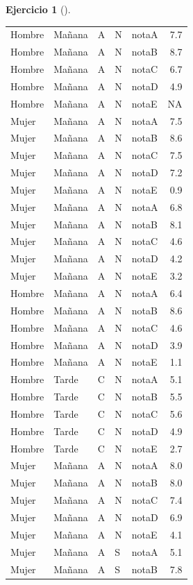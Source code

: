\documentclass[
  a4paper,
]{scrreport}
\theoremstyle{definition}
\newtheorem{exercise}{Ejercicio}[chapter]
\theoremstyle{remark}
\begin{document}
\begin{exercise}[]
\begin{enumerate}
\begin{tcolorbox}
\begin{longtable}[]{@{}lllllr@{}}
  Hombre & Mañana & A & N & notaA & 7.7 \\
  Hombre & Mañana & A & N & notaB & 8.7 \\
  Hombre & Mañana & A & N & notaC & 6.7 \\
  Hombre & Mañana & A & N & notaD & 4.9 \\
  Hombre & Mañana & A & N & notaE & NA \\
  Mujer & Mañana & A & N & notaA & 7.5 \\
  Mujer & Mañana & A & N & notaB & 8.6 \\
  Mujer & Mañana & A & N & notaC & 7.5 \\
  Mujer & Mañana & A & N & notaD & 7.2 \\
  Mujer & Mañana & A & N & notaE & 0.9 \\
  Mujer & Mañana & A & N & notaA & 6.8 \\
  Mujer & Mañana & A & N & notaB & 8.1 \\
  Mujer & Mañana & A & N & notaC & 4.6 \\
  Mujer & Mañana & A & N & notaD & 4.2 \\
  Mujer & Mañana & A & N & notaE & 3.2 \\
  Hombre & Mañana & A & N & notaA & 6.4 \\
  Hombre & Mañana & A & N & notaB & 8.6 \\
  Hombre & Mañana & A & N & notaC & 4.6 \\
  Hombre & Mañana & A & N & notaD & 3.9 \\
  Hombre & Mañana & A & N & notaE & 1.1 \\
  Hombre & Tarde & C & N & notaA & 5.1 \\
  Hombre & Tarde & C & N & notaB & 5.5 \\
  Hombre & Tarde & C & N & notaC & 5.6 \\
  Hombre & Tarde & C & N & notaD & 4.9 \\
  Hombre & Tarde & C & N & notaE & 2.7 \\
  Mujer & Mañana & A & N & notaA & 8.0 \\
  Mujer & Mañana & A & N & notaB & 8.0 \\
  Mujer & Mañana & A & N & notaC & 7.4 \\
  Mujer & Mañana & A & N & notaD & 6.9 \\
  Mujer & Mañana & A & N & notaE & 4.1 \\
  Mujer & Mañana & A & S & notaA & 5.1 \\
  Mujer & Mañana & A & S & notaB & 7.8 \\

\end{longtable}
\end{tcolorbox}
\end{enumerate}
\end{exercise}
\end{document}
